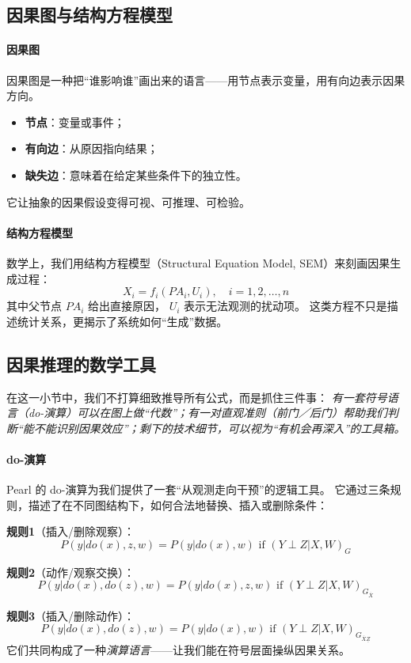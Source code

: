 \subsection{因果图与结构方程模型}

\paragraph{因果图}
因果图是一种把“谁影响谁”画出来的语言——用节点表示变量，用有向边表示因果方向。  
\begin{itemize}
\item \textbf{节点}：变量或事件；  
\item \textbf{有向边}：从原因指向结果；  
\item \textbf{缺失边}：意味着在给定某些条件下的独立性。  
\end{itemize}
它让抽象的因果假设变得可视、可推理、可检验。

\paragraph{结构方程模型}
数学上，我们用结构方程模型（Structural Equation Model, SEM）来刻画因果生成过程：
$$X_i = f_i(PA_i, U_i), \quad i = 1, 2, \ldots, n$$
其中父节点 $PA_i$ 给出直接原因， $U_i$ 表示无法观测的扰动项。  
这类方程不只是描述统计关系，更揭示了系统如何“生成”数据。

\subsection{因果推理的数学工具}
在这一小节中，我们不打算细致推导所有公式，而是抓住三件事：  
\emph{有一套符号语言（do-演算）可以在图上做“代数”；有一对直观准则（前门／后门）帮助我们判断“能不能识别因果效应”；剩下的技术细节，可以视为“有机会再深入”的工具箱。}

\paragraph{do-演算}
Pearl 的 do-演算为我们提供了一套“从观测走向干预”的逻辑工具。  
它通过三条规则，描述了在不同图结构下，如何合法地替换、插入或删除条件：

\textbf{规则1}（插入/删除观察）：
$$P(y|do(x), z, w) = P(y|do(x), w) \text{ if } (Y \perp Z | X, W)_G$$

\textbf{规则2}（动作/观察交换）：
$$P(y|do(x), do(z), w) = P(y|do(x), z, w) \text{ if } (Y \perp Z | X, W)_{G_{\overline{X}}}$$

\textbf{规则3}（插入/删除动作）：
$$P(y|do(x), do(z), w) = P(y|do(x), w) \text{ if } (Y \perp Z | X, W)_{G_{\overline{X}\underline{Z}}}$$
它们共同构成了一种\emph{演算语言}——让我们能在符号层面操纵因果关系。

